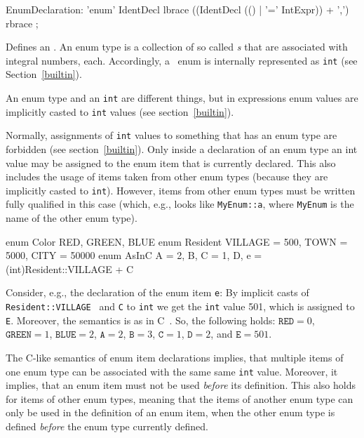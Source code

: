 \begin{rail}
  EnumDeclaration: 'enum' IdentDecl lbrace ((IdentDecl (() | '=' IntExpr)) + ',') rbrace ;
\end{rail}
Defines an .
An enum type is a collection of so called \emph{s} that are associated with integral numbers, each.
Accordingly, a \GrG\ enum is internally represented as \texttt{int} (see Section~\ref{builtin}).
\begin{note}
	An enum type and an {\tt int} are different things, but in expressions enum values are implicitly casted to {\tt int} values 	(see section~\ref{builtin}).
\end{note}
\begin{note}
	Normally, assignments of {\tt int} values to something that has an enum type are forbidden (see section~\ref{builtin}).
	Only inside a declaration of an enum type an int value may be assigned to the enum item that is currently declared.
	This also includes the usage of items taken from other enum types (because they are implicitly casted to {\tt int}).
	However, items from other enum types must be written fully qualified in this case (which, e.g., looks like {\tt MyEnum::a}, where {\tt MyEnum} is the name of the other enum type).
\end{note}

\begin{example}
\begin{grgen}
enum Color {RED, GREEN, BLUE}
enum Resident {VILLAGE = 500, TOWN = 5000, CITY = 50000}
enum AsInC {A = 2, B, C = 1, D, e = (int)Resident::VILLAGE + C}
\end{grgen}
Consider, e.g., the declaration of the enum item {\tt e}:
By implicit casts of   {\tt Resident::VILLAGE } and {\tt C} to {\tt int} we get the {\tt int} value 501, which is assigned to {\tt E}.
Moreover, the semantics is as in C~\cite{Sch:1990:ANSIC}. So, the following holds: $\texttt{RED} = 0$, $\texttt{GREEN} = 1$, $\texttt{BLUE} = 2$, $\texttt{A}=2$, $\texttt{B}=3$, $\texttt{C}=1$, $\texttt{D}=2$, and $\texttt{E}=501$.
\end{example}
\begin{note}
	The C-like semantics of enum item declarations implies, that multiple items of one enum type can be associated with the same same {\tt int} value.
	Moreover, it implies, that an enum item must not be used \emph{before} its definition.
	This also holds for items of other enum types, meaning that the items of another enum type can only be used in the definition of an enum item, when the other enum type is defined \emph{before} the enum type currently defined.
\end{note}


